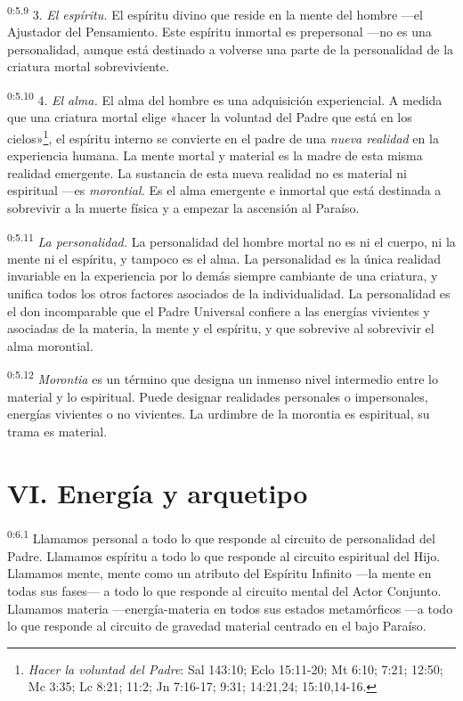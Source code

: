 \par
\textsuperscript{0:5.9} 3. \textit{El espíritu.} El espíritu divino que reside en la mente del hombre ---el Ajustador del Pensamiento. Este espíritu inmortal es prepersonal ---no es una personalidad, aunque está destinado a volverse una parte de la personalidad de la criatura mortal sobreviviente.

\par
\textsuperscript{0:5.10} 4. \textit{El alma.} El alma del hombre es una adquisición experiencial. A medida que una criatura mortal elige «hacer la voluntad del Padre que está en los cielos»\footnote{\textit{Hacer la voluntad del Padre}: Sal 143:10; Eclo 15:11-20; Mt 6:10; 7:21; 12:50; Mc 3:35; Lc 8:21; 11:2; Jn 7:16-17; 9:31; 14:21,24; 15:10,14-16.}, el espíritu interno se convierte en el padre de una \textit{nueva realidad} en la experiencia humana. La mente mortal y material es la madre de esta misma realidad emergente. La sustancia de esta nueva realidad no es material ni espiritual ---es \textit{morontial.} Es el alma emergente e inmortal que está destinada a sobrevivir a la muerte física y a empezar la ascensión al Paraíso.

\par
\textsuperscript{0:5.11} \textit{La personalidad.} La personalidad del hombre mortal no es ni el cuerpo, ni la mente ni el espíritu, y tampoco es el alma. La personalidad es la única realidad invariable en la experiencia por lo demás siempre cambiante de una criatura, y unifica todos los otros factores asociados de la individualidad. La personalidad es el don incomparable que el Padre Universal confiere a las energías vivientes y asociadas de la materia, la mente y el espíritu, y que sobrevive al sobrevivir el alma morontial.

\par
\textsuperscript{0:5.12} \textit{Morontia} es un término que designa un inmenso nivel intermedio entre lo material y lo espiritual. Puede designar realidades personales o impersonales, energías vivientes o no vivientes. La urdimbre de la morontia es espiritual, su trama es material.

\section*{VI. Energía y arquetipo}
\par
\textsuperscript{0:6.1} Llamamos personal a todo lo que responde al circuito de personalidad del Padre. Llamamos espíritu a todo lo que responde al circuito espiritual del Hijo. Llamamos mente, mente como un atributo del Espíritu Infinito ---la mente en todas sus fases--- a todo lo que responde al circuito mental del Actor Conjunto. Llamamos materia ---energía-materia en todos sus estados metamórficos ---a todo lo que responde al circuito de gravedad material centrado en el bajo Paraíso.

